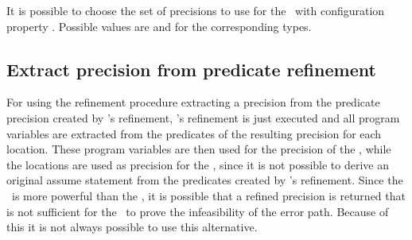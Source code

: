 It is possible to choose the set of precisions to use for the \constraintsCPA\ with configuration property .
Possible values are  and  for the corresponding types.

\subsection{Extract precision from predicate refinement}
For using the refinement procedure extracting a precision from the predicate precision created by \predicateCPA's refinement, \predicateCPA's refinement is just executed
and all program variables are extracted from the predicates of the resulting precision for each location.
These program variables are then used for the precision of the , while the locations are used as precision for the \constraintsCPA, since it is not possible to derive an original assume statement from the predicates created by \predicateCPA's refinement.
Since the \predicateCPA\ is more powerful than the \symbolicExecutionCPA, it is possible that a refined precision is returned that is not sufficient for the \symbolicExecutionCPA\ to prove the infeasibility of the error path.
Because of this it is not always possible to use this alternative.

